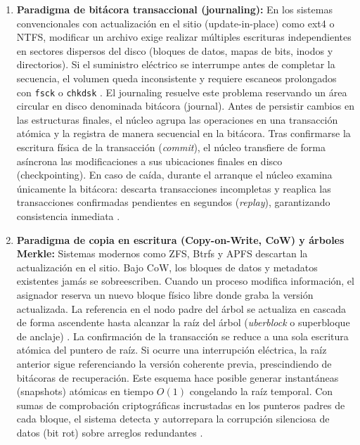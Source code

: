 \documentclass[12pt]{article}
\begin{document}
\begin{enumerate}[noitemsep, topsep=2pt]
    \item \textbf{Paradigma de bitácora transaccional (journaling):} En los sistemas convencionales con actualización en el sitio (update-in-place) como ext4 o NTFS, modificar un archivo exige realizar múltiples escrituras independientes en sectores dispersos del disco (bloques de datos, mapas de bits, inodos y directorios). Si el suministro eléctrico se interrumpe antes de completar la secuencia, el volumen queda inconsistente y requiere escaneos prolongados con \texttt{fsck} o \texttt{chkdsk} \parencite[\S 12.9, pp.\ 586--588]{stallings2018operating}. El journaling resuelve este problema reservando un área circular en disco denominada bitácora (journal). Antes de persistir cambios en las estructuras finales, el núcleo agrupa las operaciones en una transacción atómica y la registra de manera secuencial en la bitácora. Tras confirmarse la escritura física de la transacción (\textit{commit}), el núcleo transfiere de forma asíncrona las modificaciones a sus ubicaciones finales en disco (checkpointing). En caso de caída, durante el arranque el núcleo examina únicamente la bitácora: descarta transacciones incompletas y reaplica las transacciones confirmadas pendientes en segundos (\textit{replay}), garantizando consistencia inmediata \parencite[\S 11.6, p.\ 393]{silberschatz2006fundamentos}.
    \item \textbf{Paradigma de copia en escritura (Copy-on-Write, CoW) y árboles Merkle:} Sistemas modernos como ZFS, Btrfs y APFS descartan la actualización en el sitio. Bajo CoW, los bloques de datos y metadatos existentes jamás se sobreescriben. Cuando un proceso modifica información, el asignador reserva un nuevo bloque físico libre donde graba la versión actualizada. La referencia en el nodo padre del árbol se actualiza en cascada de forma ascendente hasta alcanzar la raíz del árbol (\textit{uberblock} o superbloque de anclaje) \parencite{openzfs2024docs}. La confirmación de la transacción se reduce a una sola escritura atómica del puntero de raíz. Si ocurre una interrupción eléctrica, la raíz anterior sigue referenciando la versión coherente previa, prescindiendo de bitácoras de recuperación. Este esquema hace posible generar instantáneas (snapshots) atómicas en tiempo $O(1)$ congelando la raíz temporal. Con sumas de comprobación criptográficas incrustadas en los punteros padres de cada bloque, el sistema detecta y autorrepara la corrupción silenciosa de datos (bit rot) sobre arreglos redundantes \parencite{openzfs2024docs, kernel2024btrfs}.

\end{enumerate}
\end{document}

